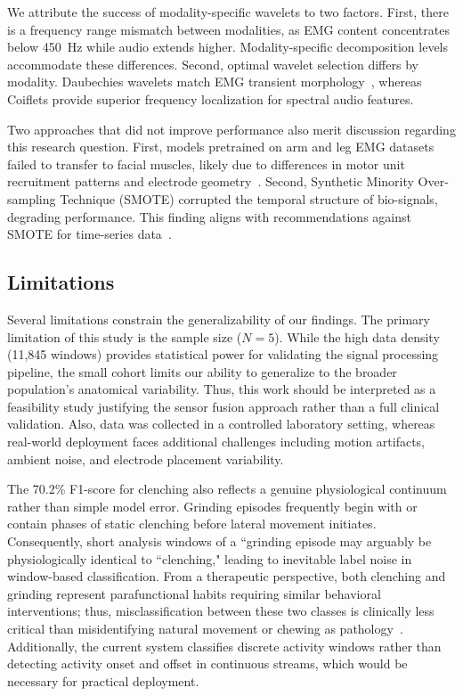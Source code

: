 \documentclass[pdflatex,sn-vancouver-num, iicol]{sn-jnl}
\begin{document}
We attribute the success of modality-specific wavelets to two factors. First, there is a frequency range mismatch between modalities, as EMG content concentrates below 450~Hz while audio extends higher. Modality-specific decomposition levels accommodate these differences. Second, optimal wavelet selection differs by modality. Daubechies wavelets match EMG transient morphology~\cite{englehart2003robust}, whereas Coiflets provide superior frequency localization for spectral audio features.

Two approaches that did not improve performance also merit discussion regarding this research question. First, models pretrained on arm and leg EMG datasets failed to transfer to facial muscles, likely due to differences in motor unit recruitment patterns and electrode geometry~\cite{jiang2012myoelectric}. Second, Synthetic Minority Over-sampling Technique (SMOTE) corrupted the temporal structure of bio-signals, degrading performance. This finding aligns with recommendations against SMOTE for time-series data~\cite{johnson2019survey}.

\subsection{Limitations}
Several limitations constrain the generalizability of our findings. The primary limitation of this study is the sample size ($N=5$). While the high data density (11,845 windows) provides statistical power for validating the signal processing pipeline, the small cohort limits our ability to generalize to the broader population's anatomical variability. Thus, this work should be interpreted as a feasibility study justifying the sensor fusion approach rather than a full clinical validation. Also, data was collected in a controlled laboratory setting, whereas real-world deployment faces additional challenges including motion artifacts, ambient noise, and electrode placement variability. 

The 70.2\% F1-score for clenching also reflects a genuine physiological continuum rather than simple model error. Grinding episodes frequently begin with or contain phases of static clenching before lateral movement initiates. Consequently, short analysis windows of a ``grinding episode may arguably be physiologically identical to ``clenching," leading to inevitable label noise in window-based classification. From a therapeutic perspective, both clenching and grinding represent parafunctional habits requiring similar behavioral interventions; thus, misclassification between these two classes is clinically less critical than misidentifying natural movement or chewing as pathology~\cite{lobbezoo2018international}. Additionally, the current system classifies discrete activity windows rather than detecting activity onset and offset in continuous streams, which would be necessary for practical deployment.
\end{document}
